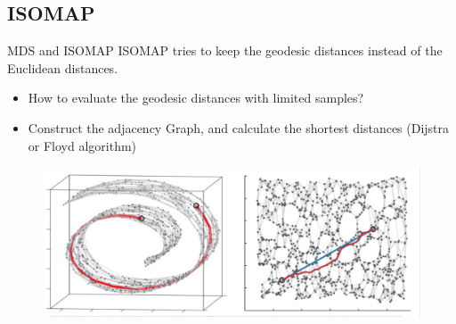 \documentclass{beamer}
\begin{document}
\begin{darkframes}
   
   \subsection{ISOMAP}
    \begin{frame}{MDS and ISOMAP}
     \alert{ISOMAP} tries to keep the geodesic distances instead of the Euclidean distances.
    \begin{itemize}
    	\item How to evaluate the geodesic distances with limited samples?
    	\item Construct the adjacency Graph, and calculate the shortest distances (Dijstra or Floyd algorithm)
    \end{itemize}
   	
   	\begin{figure}
   	\centering
   	\includegraphics[scale=0.2]{./figs/fig6.eps}
   	\end{figure}
    \end{frame}
    

\end{darkframes}
\end{document}
